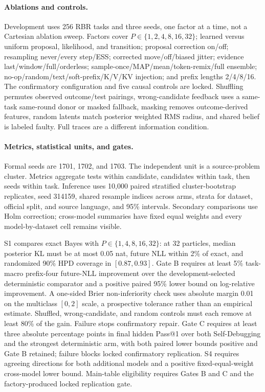 \paragraph{Ablations and controls.}
Development uses 256 RBR tasks and three seeds, one factor at a time, not a
Cartesian ablation sweep. Factors cover $P\in\{1,2,4,8,16,32\}$; learned versus
uniform proposal, likelihood, and transition; proposal correction on/off;
resampling never/every step/ESS; corrected move/off/biased jitter; evidence
last/window/full/orderless; sample-once/MAP/mean/token-remix/full ensemble;
no-op/random/text/soft-prefix/K/V/KV injection; and prefix lengths 2/4/8/16.
The confirmatory configuration and five causal controls are locked. Shuffling
permutes observed outcome/test pairings, wrong-candidate feedback uses a
same-task same-round donor or masked fallback, masking removes outcome-derived
features, random latents match posterior weighted RMS radius, and shared belief
is labeled faulty. Full traces are a different information condition.

\paragraph{Metrics, statistical units, and gates.}
Formal seeds are 1701, 1702, and 1703. The independent unit is a source-problem
cluster. Metrics aggregate tests within candidate, candidates within task,
then seeds within task. Inference uses 10,000 paired stratified cluster-bootstrap
replicates, seed 314159, shared resample indices across arms, strata for dataset,
official split, and source language, and 95\% intervals. Secondary comparisons
use Holm correction; cross-model summaries have fixed equal weights and every
model-by-dataset cell remains visible.

S1 compares exact Bayes with $P\in\{1,4,8,16,32\}$: at 32 particles, median
posterior KL must be at most 0.05 nat, future NLL within 2\% of exact, and
randomized 90\% HPD coverage in $[0.87,0.93]$. Gate B requires at least 5\%
task-macro prefix-four future-NLL improvement over the development-selected
deterministic comparator and a positive paired 95\% lower bound on log-relative
improvement. A one-sided Brier non-inferiority check uses absolute margin 0.01
on the multiclass $[0,2]$ scale, a prospective tolerance rather than an empirical
estimate. Shuffled, wrong-candidate, and random controls must each remove at
least 80\% of the gain. Failure stops confirmatory repair. Gate C requires at
least three absolute percentage points in final hidden Pass@1 over both
Self-Debugging and the strongest deterministic arm, with both paired lower
bounds positive and Gate B retained; failure blocks locked confirmatory
replication. S4 requires agreeing directions for both additional models and
a positive fixed-equal-weight cross-model lower bound. Main-table eligibility
requires Gates B and C and the factory-produced locked replication gate.

